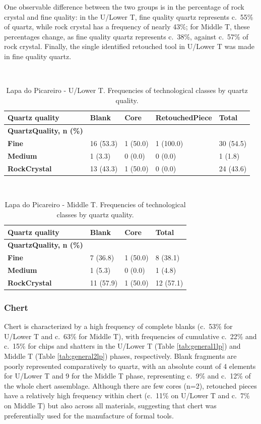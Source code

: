 \documentclass[12pt,twoside]{reedthesis}
\begin{document}
One observable difference between the two groups is in the percentage of rock crystal and fine quality: in the U/Lower T, fine quality quartz represents c.~55\% of quartz, while rock crystal has a frequency of nearly 43\%; for Middle T, these percentages change, as fine quality quartz represents c.~38\%, against c.~57\% of rock crystal. Finally, the single identified retouched tool in U/Lower T was made in fine quality quartz.

~
\begin{table}[!h]

\caption{\label{tab:quartzqualityTG}Lapa do Picareiro - U/Lower T. Frequencies of technological classes by quartz quality.}
\centering
\fontsize{9}{11}\selectfont
\begin{tabular}[t]{>{\bfseries}lllll}
\toprule
Quartz quality & Blank & Core & RetouchedPiece & Total\\
\midrule
QuartzQuality, n (\%) &  &  &  & \\
Fine & 16 (53.3) & 1 (50.0) & 1 (100.0) & 30 (54.5)\\
Medium & 1 (3.3) & 0 (0.0) & 0 (0.0) & 1 (1.8)\\
RockCrystal & 13 (43.3) & 1 (50.0) & 0 (0.0) & 24 (43.6)\\
\bottomrule
\end{tabular}
\end{table}
~
\begin{table}[!h]

\caption{\label{tab:quartzqualityPR}Lapa do Picareiro - Middle T. Frequencies of technological classes by quartz quality.}
\centering
\fontsize{9}{11}\selectfont
\begin{tabular}[t]{>{\bfseries}llll}
\toprule
Quartz quality & Blank & Core & Total\\
\midrule
QuartzQuality, n (\%) &  &  & \\
Fine & 7 (36.8) & 1 (50.0) & 8 (38.1)\\
Medium & 1 (5.3) & 0 (0.0) & 1 (4.8)\\
RockCrystal & 11 (57.9) & 1 (50.0) & 12 (57.1)\\
\bottomrule
\end{tabular}
\end{table}
\hypertarget{chert-1}{%
\subsubsection{Chert}\label{chert-1}}

Chert is characterized by a high frequency of complete blanks (c.~53\% for U/Lower T and c.~63\% for Middle T), with frequencies of cumulative c.~22\% and c.~15\% for chips and shatters in the U/Lower T (Table \ref{tab:general1lp}) and Middle T (Table \ref{tab:general2lp}) phases, respectively. Blank fragments are poorly represented comparatively to quartz, with an absolute count of 4 elements for U/Lower T and 9 for the Middle T phase, representing c.~9\% and c.~12\% of the whole chert assemblage. Although there are few cores (n=2), retouched pieces have a relatively high frequency within chert (c.~11\% on U/Lower T and c.~7\% on Middle T) but also across all materials, suggesting that chert was preferentially used for the manufacture of formal tools.
\end{document}
